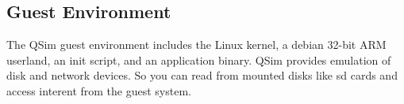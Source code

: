 \documentclass[letterpaper, 10pt]{book}
\begin{document}

\subsection{Guest Environment}

The QSim guest environment includes the Linux kernel, a debian 32-bit ARM
userland, an init script, and an application binary. QSim provides emulation of
disk and network devices. So you can read from mounted disks like sd cards and
access interent from the guest system.

\end{document}
